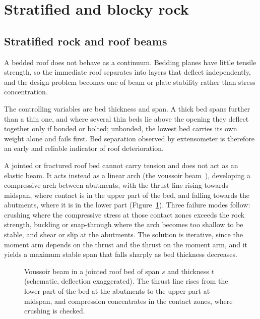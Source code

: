 \section{Stratified and blocky rock}
\label{sec:stratified-and-blocky}

\subsection{Stratified rock and roof beams}
\label{sec:stratified-rock}

A bedded roof does not behave as a continuum. Bedding planes have little
tensile strength, so the immediate roof separates into layers that deflect
independently, and the design problem becomes one of beam or plate stability
rather than stress concentration.

The controlling variables are bed thickness and span. A thick bed spans
further than a thin one, and where several thin beds lie above the opening
they deflect together only if bonded or bolted; unbonded, the lowest bed
carries its own weight alone and fails first. Bed separation observed by
extensometer is therefore an early and reliable indicator of roof
deterioration.

A jointed or fractured roof bed cannot carry tension and does not act as an
elastic beam. It acts instead as a linear arch (the voussoir beam~\citep{beer1983voussoir}),
developing a compressive arch between abutments, with the thrust line rising
towards midspan, where contact is in the upper part of the bed, and falling
towards the abutments, where it is in the lower part
(Figure~\ref{fig:voussoir-roof}). Three failure modes
follow: crushing where the compressive stress at those contact zones exceeds
the rock strength, buckling or snap-through where the arch becomes too
shallow to be stable, and shear or slip at the abutments. The solution is iterative, since the moment arm depends on the
thrust and the thrust on the moment arm, and it yields a maximum stable span
that falls sharply as bed thickness decreases.

\begin{figure}[htbp]
\centering
{}
\caption{Voussoir beam in a jointed roof bed of span $s$ and thickness $t$ (schematic, deflection exaggerated). The thrust line rises from the lower part of the bed at the abutments to the upper part at midspan, and compression concentrates in the contact zones, where crushing is checked.}
\label{fig:voussoir-roof}
\end{figure}

